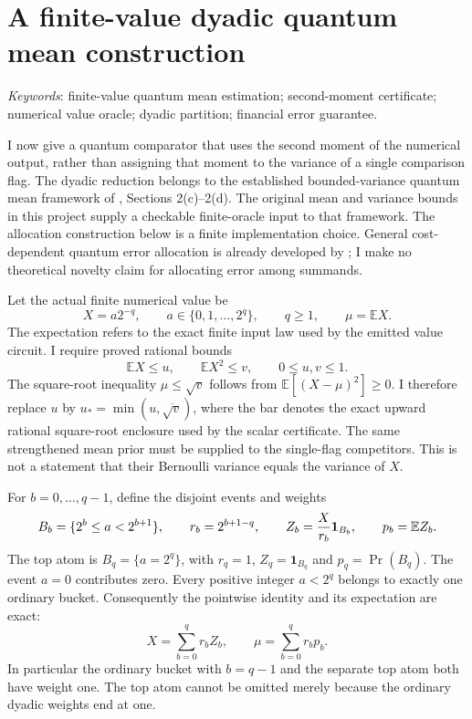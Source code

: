 
\section{A finite-value dyadic quantum mean construction}
\label{sec:dyadic-construction}

\emph{Keywords}: finite-value quantum mean estimation; second-moment certificate; numerical value oracle; dyadic partition; financial error guarantee.

I now give a quantum comparator that uses the second moment of the numerical output, rather than assigning that moment to the variance of a single comparison flag. The dyadic reduction belongs to the established bounded-variance quantum mean framework of \citet{montanaro}, Sections 2(c)--2(d). The original mean and variance bounds in this project supply a checkable finite-oracle input to that framework. The allocation construction below is a finite implementation choice. General cost-dependent quantum error allocation is already developed by \citet{an}; I make no theoretical novelty claim for allocating error among summands.

Let the actual finite numerical value be
\[
 X= a2^{-q},\qquad a\in\{0,1,\ldots,2^q\},\qquad q\geq1,
 \qquad \mu=\mathbb E X.
\]
The expectation refers to the exact finite input law used by the emitted value circuit. I require proved rational bounds
\[
 \mathbb E X\leq u,\qquad \mathbb E X^2\leq v,
 \qquad 0\leq u,v\leq1.
\]
The square-root inequality \(\mu\leq\sqrt v\) follows from
\(\mathbb E[(X-\mu)^2]\geq0\). I therefore replace \(u\) by
\(u_* = \min(u,\overline{\sqrt v})\), where the bar denotes the exact upward rational square-root enclosure used by the scalar certificate. The same strengthened mean prior must be supplied to the single-flag competitors. This is not a statement that their Bernoulli variance equals the variance of \(X\).

For \(b=0,\ldots,q-1\), define the disjoint events and weights
\[
 B_b=\{2^b\leq a<2^{b+1}\},\qquad r_b=2^{b+1-q},
 \qquad Z_b={X\over r_b}\mathbf 1_{B_b},\qquad p_b=\mathbb E Z_b.
\]
The top atom is \(B_q=\{a=2^q\}\), with \(r_q=1\), \(Z_q=\mathbf1_{B_q}\) and \(p_q=\Pr(B_q)\). The event \(a=0\) contributes zero. Every positive integer \(a<2^q\) belongs to exactly one ordinary bucket. Consequently the pointwise identity and its expectation are exact:
\[
 X=\sum_{b=0}^q r_bZ_b,
 \qquad \mu=\sum_{b=0}^q r_bp_b.
 \tag{D1}\label{eq:dyadic-identity}
\]
In particular the ordinary bucket with \(b=q-1\) and the separate top atom both have weight one. The top atom cannot be omitted merely because the ordinary dyadic weights end at one.

